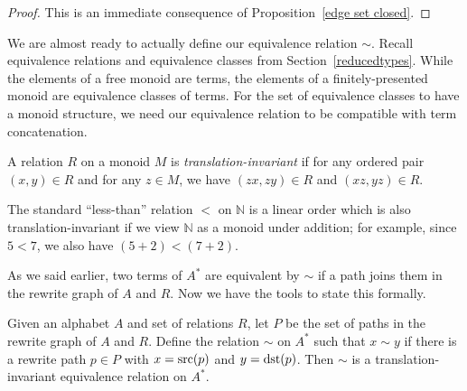 \documentclass[../generics]{subfiles}
\begin{document}
\begin{proof}
This is an immediate consequence of Proposition~\ref{edge set closed}.
\end{proof}

We are almost ready to actually define our equivalence relation $\sim$. Recall equivalence relations and equivalence classes from Section~\ref{reducedtypes}. While the elements of a free monoid are terms, the elements of a finitely-presented monoid are equivalence classes of terms. For the set of equivalence classes to have a monoid structure, we need our equivalence relation to be compatible with term concatenation.
\begin{definition}
%
A relation $R$ on a monoid $M$ is \emph{translation-invariant} if for any ordered pair $(x,y)\in R$ and for any $z\in M$, we have $(zx,zy)\in R$ and $(xz,yz)\in R$.
\end{definition}
\begin{example}
The standard ``less-than'' relation $<$ on $\mathbb{N}$ is a linear order which is also translation-invariant if we view $\mathbb{N}$ as a monoid under addition; for example, since $5<7$, we also have $(5+2)<(7+2)$.
\end{example}
As we said earlier, two terms of $A^*$ are equivalent by $\sim$ if a path joins them in the rewrite graph of $A$ and $R$. Now we have the tools to state this formally.
\begin{proposition}\label{monoid congruence}
Given an alphabet $A$ and set of relations $R$, let $P$ be the set of paths in the rewrite graph of $A$ and $R$. Define the relation \index{$\sim$}$\sim$ on $A^*$ such that $x\sim y$ if there is a rewrite path $p\in P$ with $x=\operatorname{src}(p)$ and $y=\operatorname{dst}(p)$. Then $\sim$ is a translation-invariant equivalence relation on $A^*$.
\end{proposition}
\end{document}
